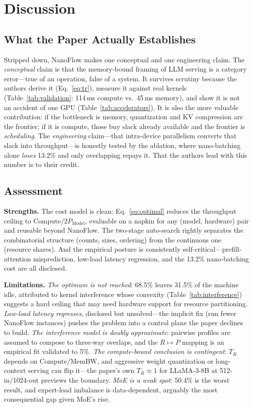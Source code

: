 \documentclass[manuscript,review]{acmart}
\newcommand{\nf}{NanoFlow\xspace}   %
\newcommand{\Pmodel}{P_{\mathrm{Model}}}
\newcommand{\membw}{\mathrm{MemBW}}
\newcommand{\compute}{\mathrm{Compute}}
\begin{document}
\section{Discussion}
\label{sec:discussion}

\subsection{What the Paper Actually Establishes}

Stripped down, \nf makes one conceptual and one engineering claim. The \emph{conceptual} claim is that the 
memory-bound framing of LLM serving is a category error---true of an operation, false of a system. It survives 
scrutiny because the authors derive it (Eq.~\ref{eq:tr}), measure it against real kernels 
(Table~\ref{tab:validation}: 114\,ms compute vs.\ 45\,ms memory), and show it is not an accident of one GPU 
(Table~\ref{tab:accelerators}). It is also the more valuable contribution: if the bottleneck is memory, 
quantization and KV compression are the frontier; if it is compute, those buy slack already available and the 
frontier is \emph{scheduling}. The \emph{engineering} claim---that intra-device parallelism converts that slack 
into throughput---is honestly tested by the ablation, where nano-batching alone \emph{loses} 13.2\% and only 
overlapping repays it. That the authors lead with this number is to their credit.

\subsection{Assessment}

\textbf{Strengths.} The cost model is clean: Eq.~\ref{eq:optimal} reduces the throughput ceiling to 
$\compute/2\Pmodel$, evaluable on a napkin for any (model, hardware) pair and reusable beyond \nf. The two-stage 
auto-search rightly separates the combinatorial structure (counts, sizes, ordering) from the continuous one 
(resource shares). And the empirical posture is consistently self-critical---prefill-attention misprediction, 
low-load latency regression, and the 13.2\% nano-batching cost are all disclosed.

\textbf{Limitations.} \emph{The optimum is not reached}: 68.5\% leaves 31.5\% of the machine idle, attributed to 
kernel interference whose convexity (Table~\ref{tab:interference}) suggests a hard ceiling that may need 
hardware support for resource partitioning. \emph{Low-load latency regresses}, disclosed but unsolved---the 
implicit fix (run fewer \nf instances) pushes the problem into a control plane the paper declines to build. 
\emph{The interference model is doubly approximate}: pairwise profiles are assumed to compose to three-way 
overlaps, and the $R \mapsto P$ mapping is an empirical fit validated to 5\%. \emph{The compute-bound conclusion 
is contingent}: $T_R$ depends on $\compute/\membw$, and aggressive weight quantization or long-context serving can 
flip it---the paper's own $T_R \approx 1$ for LLaMA-3-8B at 512-in/1024-out previews the boundary. \emph{MoE is 
a weak spot}: 50.4\% is the worst result, and expert-load imbalance is data-dependent, arguably the most 
consequential gap given MoE's rise.
\end{document}
